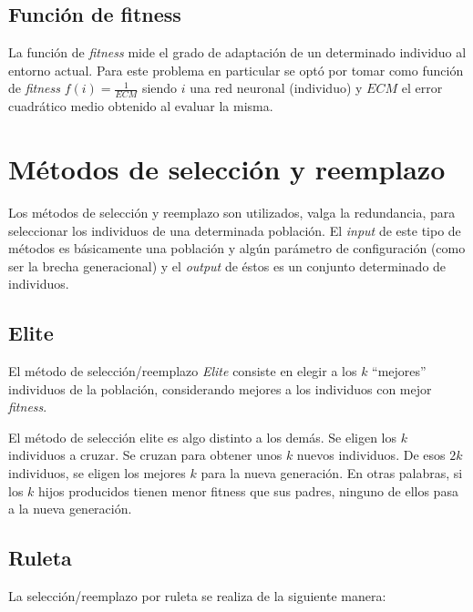 \documentclass[%
    final,
    reprint,
    notitlepage,
    narroweqnarray,
    inline,
    twoside,
    invited
    ]{ieee}
\begin{document}
\subsection{Función de fitness}

\par La función de \textit{fitness} mide el grado de adaptación de un determinado individuo al entorno actual. Para este problema en particular se optó por tomar como función de \textit{fitness} $f(i) = \frac{1}{ECM}$ siendo $i$ una red neuronal (individuo) y $ECM$ el error cuadrático medio obtenido al evaluar la misma.

\section{Métodos de selección y reemplazo}

\par Los métodos de selección y reemplazo son utilizados, valga la redundancia, para seleccionar los individuos de una determinada población. El \textit{input} de este tipo de métodos es básicamente una población y algún parámetro de configuración (como ser la brecha generacional) y el \textit{output} de éstos es un conjunto determinado de individuos.

\subsection{Elite}

\par El método de selección/reemplazo \textit{Elite} consiste en elegir a los $k$ ``mejores'' individuos de la población, considerando mejores a los individuos con mejor \textit{fitness}.

\par El método de selección elite es algo distinto a los demás. Se eligen los $k$ individuos a cruzar. Se cruzan 
para obtener unos $k$ nuevos individuos. De esos $2k$ individuos, se eligen los mejores $k$ para la nueva 
generación. En otras palabras, si los $k$ hijos producidos tienen menor fitness que sus padres, ninguno de 
ellos pasa a la nueva generación.

\subsection{Ruleta}

\par La selección/reemplazo por ruleta se realiza de la siguiente manera:\\
\end{document}
